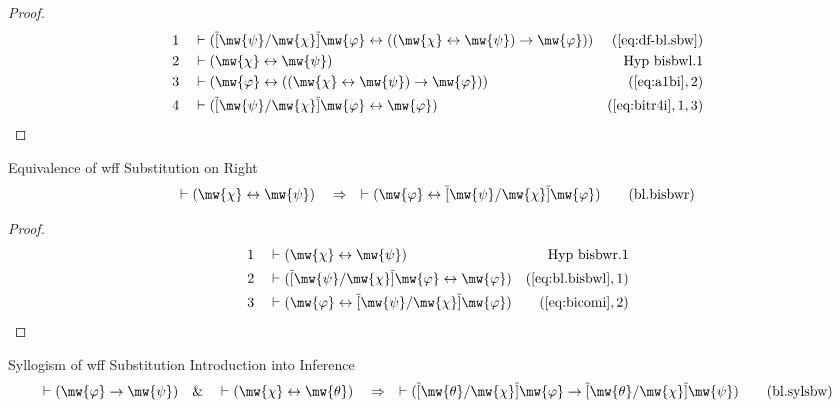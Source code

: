 \begin{proof}
\begin{align}
  1 &&  & \vdash ( \overline{[} \mw{\psi} / \mw{\chi} \overline{]} \mw{\varphi}
     \leftrightarrow ( ( \mw{\chi} \leftrightarrow
     \mw{\psi} ) \rightarrow \mw{\varphi} )
     )&(\mbox{\ref{eq:df-bl.sbw}})\notag
  \\ 2 &&  & \vdash ( \mw{\chi} \leftrightarrow \mw{\psi}
     )&\text{Hyp~bisbwl.1}\notag%
  \\ 3 &&  & \vdash ( \mw{\varphi} \leftrightarrow ( ( \mw{\chi}
     \leftrightarrow \mw{\psi} ) \rightarrow \mw{\varphi}
     ) )&(\mbox{\ref{eq:a1bi}},2)\notag
  \\ 4 &&  & \vdash ( \overline{[} \mw{\psi} / \mw{\chi} \overline{]}
     \mw{\varphi} \leftrightarrow \mw{\varphi}
     )&(\mbox{\ref{eq:bitr4i}},1,3)\notag
\end{align}
\end{proof}

\begin{lemma} {Equivalence of wff Substitution on Right}
\begin{align}
\vdash ( \mw{\chi} \leftrightarrow \mw{\psi} )\quad\Rightarrow\quad \vdash (
    \mw{\varphi} \leftrightarrow \overline{[} \mw{\psi} / \mw{\chi}
    \overline{]} \mw{\varphi} )\label{eq:bl.bisbwr}\tag{bl.bisbwr}
\end{align}
\end{lemma}


\begin{proof}
\begin{align}
  1 &&  & \vdash ( \mw{\chi} \leftrightarrow \mw{\psi}
     )&\text{Hyp~bisbwr.1}\notag%
  \\ 2 &&  & \vdash ( \overline{[} \mw{\psi} / \mw{\chi} \overline{]}
     \mw{\varphi} \leftrightarrow \mw{\varphi}
     )&(\mbox{\ref{eq:bl.bisbwl}},1)\notag
  \\ 3 &&  & \vdash ( \mw{\varphi} \leftrightarrow \overline{[} \mw{\psi} /
     \mw{\chi} \overline{]} \mw{\varphi}
     )&(\mbox{\ref{eq:bicomi}},2)\notag
\end{align}
\end{proof}

\begin{lemma} {Syllogism of wff Substitution}
Introduction into Inference
\begin{align}
\vdash ( \mw{\varphi} \rightarrow \mw{\psi} )\quad\&\quad \vdash ( \mw{\chi}
    \leftrightarrow \mw{\theta} )\quad\Rightarrow\quad \vdash ( \overline{[}
    \mw{\theta} / \mw{\chi} \overline{]} \mw{\varphi} \rightarrow \overline{[}
    \mw{\theta} / \mw{\chi} \overline{]} \mw{\psi}
    )\label{eq:bl.sylsbw}\tag{bl.sylsbw}
\end{align}
\end{lemma}


